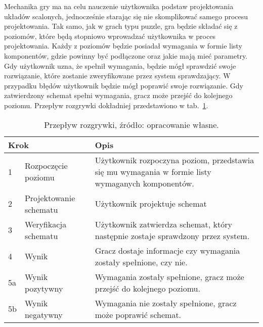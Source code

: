 Mechanika gry ma na celu nauczenie użytkownika podstaw projektowania układów scalonych,
jednocześnie starając się nie skomplikować samego procesu projektowania.
Tak samo, jak w grach typu puzzle, gra będzie składać się z poziomów,
które będą stopniowo wprowadzać użytkownika w proces projektowania.
Każdy z poziomów będzie posiadał wymagania w formie listy komponentów,
gdzie powinny być podłączone oraz jakie mają mieć parametry.
Gdy użytkownik uzna, że spełnił wymagania, będzie mógł sprawdzić swoje rozwiązanie,
które zostanie zweryfikowane przez system sprawdzający.
W przypadku błędów %
użytkownik będzie mógł poprawić swoje rozwiązanie. %
Gdy zatwierdzony schemat spełni wymagania, gracz może przejść do kolejnego poziomu.
Przepływ rozgrywki dokładniej przedstawiono w tab.~\ref{tab:game_flow}.

\begin{table}[h]
    \centering
    \caption[Przepływ rozgrywki.]
    {Przepływ rozgrywki, źródło: opracowanie własne.}
    \label{tab:game_flow}
    \begin{tabular}{|l p{}|p{}|}
        \hline
        \multicolumn{2}{|l|}{Krok} & Opis \\
        \hline
        \hline
        1 & Rozpoczęcie poziomu &
        Użytkownik rozpoczyna poziom, przedstawia się mu wymagania w formie listy wymaganych komponentów. \\
        \hline
        2 & Projektowanie schematu &
        Użytkownik projektuje schemat\\ %
        \hline
        3 & Weryfikacja schematu &
        Użytkownik zatwierdza schemat, który następnie zostaje sprawdzony przez system. \\
        \hline
        4 & Wynik &
        Gracz dostaje informacje czy wymagania zostały spełnione, czy nie. \\
        \hline
        5a & Wynik pozytywny &
        Wymagania zostały spełnione, gracz może przejść do kolejnego poziomu. \\
        \hline
        5b & Wynik negatywny &
        Wymagania nie zostały spełnione, gracz może poprawić schemat. \\
        \hline
    \end{tabular}
\end{table}

